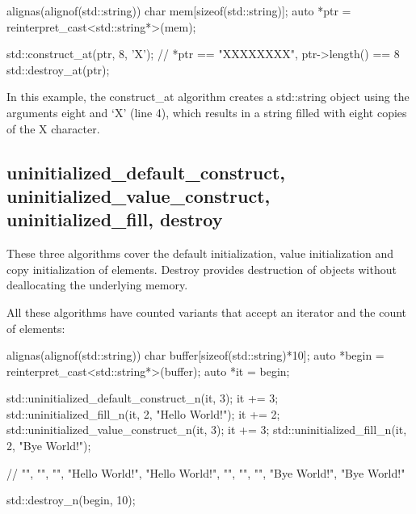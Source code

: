 
\begin{box-note}
\begin{cppcode}
alignas(alignof(std::string)) char mem[sizeof(std::string)];
auto *ptr = reinterpret_cast<std::string*>(mem);

std::construct_at(ptr, 8, 'X');
// *ptr == "XXXXXXXX", ptr->length() == 8
std::destroy_at(ptr);
\end{cppcode}
\end{box-note}

In this example, the construct\_at algorithm creates a std::string object using the arguments eight and ‘X’ (line 4), which results in a string filled with eight copies of the X character.

\subsection{uninitialized\_default\_construct, uninitialized\_value\_construct, uninitialized\_fill, destroy}

These three algorithms cover the default initialization, value initialization and copy initialization of elements. Destroy provides destruction of objects without deallocating the underlying memory.



All these algorithms have counted variants that accept an iterator and the count of elements:

\begin{box-note}
\begin{cppcode}
alignas(alignof(std::string)) char buffer[sizeof(std::string)*10];
auto *begin = reinterpret_cast<std::string*>(buffer);
auto *it = begin;

std::uninitialized_default_construct_n(it, 3);
it += 3;
std::uninitialized_fill_n(it, 2, "Hello World!");
it += 2;
std::uninitialized_value_construct_n(it, 3);
it += 3;
std::uninitialized_fill_n(it, 2, "Bye World!");

// {"", "", "", "Hello World!", "Hello World!", "", "", "", "Bye World!", "Bye World!"}

std::destroy_n(begin, 10);
\end{cppcode}
\end{box-note}

